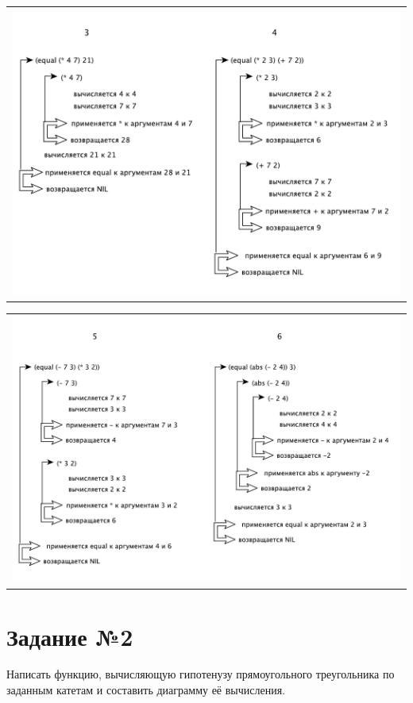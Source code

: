\begin{table}[h!]
  \centering
  \begin{tabular}{p{1\linewidth}}
    \centering
    \includegraphics[width=0.8\linewidth]{./images/3&4.pdf}
    \label{img:1}
  \end{tabular}
\end{table}

\begin{table}[h!]
  \centering
  \begin{tabular}{p{1\linewidth}}
    \centering
    \includegraphics[width=0.8\linewidth]{./images/5&6.pdf}
    \label{img:1}
  \end{tabular}
\end{table}

\section{Задание №2}
Написать функцию, вычисляющую гипотенузу прямоугольного треугольника по заданным катетам и составить диаграмму её вычисления.

